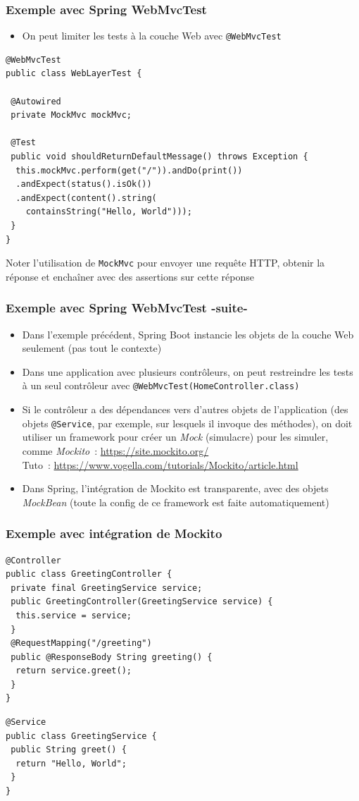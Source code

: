 \documentclass{beamer}
\begin{document}
\begin{frame}[fragile,label={webmvc}]
	\frametitle{Exemple avec Spring WebMvcTest}
	\begin{itemize}
		\item On peut limiter les tests à la couche Web avec \texttt{@WebMvcTest}
	\end{itemize}
\begin{lstlisting}
@WebMvcTest
public class WebLayerTest {
	
 @Autowired
 private MockMvc mockMvc;

 @Test
 public void shouldReturnDefaultMessage() throws Exception {
  this.mockMvc.perform(get("/")).andDo(print())
  .andExpect(status().isOk())
  .andExpect(content().string(
    containsString("Hello, World")));
 }
}
\end{lstlisting}
Noter l'utilisation de \texttt{MockMvc} pour envoyer une requête HTTP, obtenir la réponse et enchaîner avec des assertions sur cette réponse
\end{frame}

\begin{frame}
	\frametitle{Exemple avec Spring WebMvcTest -suite-}
	\begin{itemize}
		\item Dans l'exemple précédent, Spring Boot instancie les objets de la couche Web seulement (pas tout le contexte)
		\item Dans une application avec plusieurs contrôleurs, on peut restreindre les tests à un seul contrôleur avec \texttt{@WebMvcTest(HomeController.class)}
		\item Si le contrôleur a des dépendances vers d'autres objets de l'application (des objets \texttt{@Service}, par exemple, sur lesquels il invoque des méthodes), on doit utiliser un framework pour créer un \textit{Mock} (simulacre) pour les simuler, comme \textit{Mockito}~:
		\footnotesize \url{https://site.mockito.org/}\\
		\normalsize
		Tuto~: 
		\footnotesize
		\url{https://www.vogella.com/tutorials/Mockito/article.html}
		\normalsize
		\item Dans Spring, l'intégration de Mockito est transparente, avec des objets \textit{MockBean} (toute la config de ce framework est faite automatiquement)
	\end{itemize}
\end{frame}

\begin{frame}[fragile]
	\frametitle{Exemple avec intégration de Mockito}
\begin{lstlisting}
@Controller
public class GreetingController {	
 private final GreetingService service;
 public GreetingController(GreetingService service) {
  this.service = service;
 }
 @RequestMapping("/greeting")
 public @ResponseBody String greeting() {
  return service.greet();
 }	
}
\end{lstlisting}
\begin{lstlisting}
@Service
public class GreetingService {
 public String greet() {
  return "Hello, World";
 }
}	
\end{lstlisting}
\end{frame}
\end{document}

